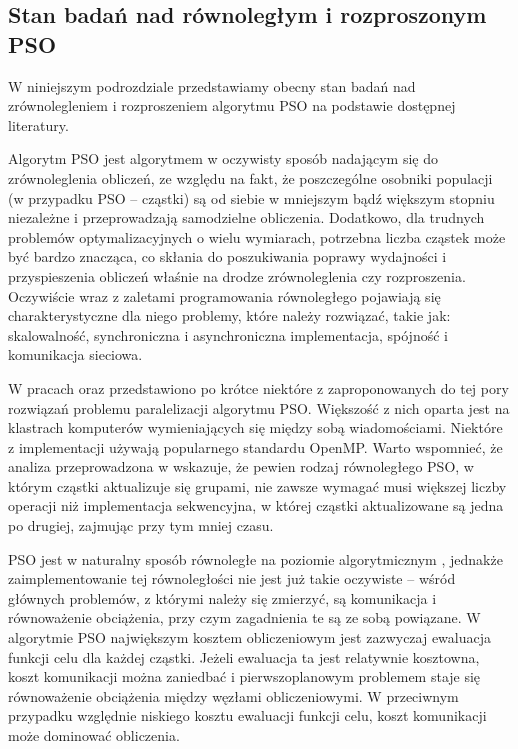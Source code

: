 \documentclass[12pt, twoside, openany, abstract=on]{report}
\theoremstyle{definition}
\begin{document}
\subsection{Stan badań nad równoległym i rozproszonym PSO}


W niniejszym podrozdziale przedstawiamy obecny stan badań nad zrównolegleniem i rozproszeniem algorytmu PSO na podstawie dostępnej literatury.

Algorytm PSO jest algorytmem w oczywisty sposób nadającym się do zrównoleglenia obliczeń, ze względu na fakt, że poszczególne osobniki populacji (w przypadku PSO – cząstki) 
 są od siebie w mniejszym bądź większym stopniu niezależne i przeprowadzają samodzielne obliczenia. Dodatkowo, dla trudnych problemów optymalizacyjnych o wielu wymiarach, potrzebna liczba cząstek może być bardzo znacząca, co skłania do poszukiwania poprawy wydajności i przyspieszenia obliczeń właśnie na drodze zrównoleglenia czy rozproszenia. 
Oczywiście wraz z zaletami programowania równoległego pojawiają się charakterystyczne dla niego problemy, które należy rozwiązać, takie jak: skalowalność, synchroniczna i asynchroniczna implementacja, spójność i komunikacja sieciowa. 

W pracach \cite{AccelParallelPso} oraz \cite{ComparisonParallelGpuPso} przedstawiono po krótce niektóre z zaproponowanych do tej pory rozwiązań problemu paralelizacji algorytmu PSO. Większość z nich oparta jest na klastrach komputerów wymieniających się między sobą wiadomościami.
Niektóre z implementacji używają popularnego standardu OpenMP. Warto wspomnieć, że analiza przeprowadzona w \cite{Pso8} wskazuje, że pewien rodzaj równoległego PSO, w którym cząstki aktualizuje się grupami, nie zawsze wymagać musi większej liczby operacji niż implementacja sekwencyjna, w której cząstki aktualizowane są jedna po drugiej, zajmując przy tym mniej czasu.

PSO jest w naturalny sposób równoległe na poziomie algorytmicznym
, jednakże zaimplementowanie tej równoległości nie jest już takie oczywiste – wśród głównych problemów, z którymi należy się zmierzyć, są komunikacja %
 i równoważenie obciążenia, przy czym zagadnienia te są ze sobą powiązane. W algorytmie PSO największym kosztem obliczeniowym jest zazwyczaj ewaluacja funkcji celu dla każdej cząstki. Jeżeli ewaluacja ta jest relatywnie kosztowna, koszt komunikacji można zaniedbać i pierwszoplanowym problemem staje się równoważenie obciążenia między węzłami obliczeniowymi.
W przeciwnym przypadku względnie niskiego kosztu ewaluacji funkcji celu, koszt komunikacji może dominować obliczenia.
\end{document}
